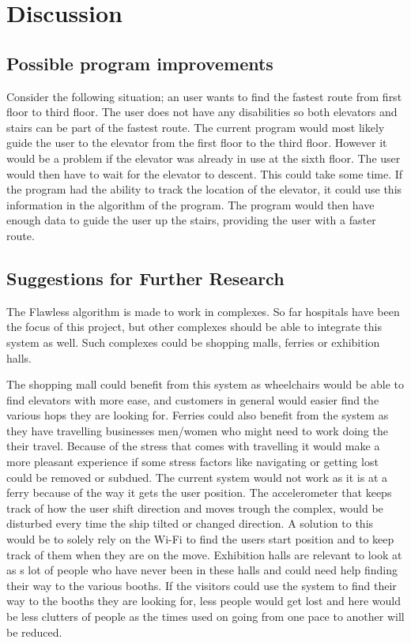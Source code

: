 \chapter{Discussion}

\section{Possible program improvements}

Consider the following situation; an user wants to find the fastest route from first floor to third floor. The user does not have any disabilities so both elevators and stairs can be part of the fastest route. The current program would most likely guide the user to the elevator from the first floor to the third floor. However it would be a problem if the elevator was already in use at the sixth floor. The user would then have to wait for the elevator to descent. This could take some time. If the program had the ability to track the location of the elevator, it could use this information in the algorithm of the program. The program would then have enough data to guide the user up the stairs, providing the user with a faster route.

\section{Suggestions for Further Research}

The Flawless algorithm is made to work in complexes. So far hospitals have been the focus of this project, but other complexes should be able to integrate this system as well. Such complexes could be shopping malls, ferries or exhibition halls. 

The shopping mall could benefit from this system as wheelchairs would be able to find elevators with more ease, and customers in general would easier find the various hops they are looking for. Ferries could also benefit from the system as they have travelling businesses men/women who might need to work doing the their travel. Because of the stress that comes with travelling\cite{future_stress} it would make a more pleasant experience if some stress factors like navigating or getting lost could be removed or subdued. The current system would not work as it is at a ferry because of the way it gets the user position. The accelerometer that keeps track of how the user shift direction and moves trough the complex, would be disturbed every time the ship tilted or changed direction. A solution to this would be to solely rely on the Wi-Fi to find the users start position and to keep track of them when they are on the move. Exhibition halls are relevant to look at as s lot of people who have never been in these halls and could need help finding their way to the various booths. If the visitors could use the system to find their way to the booths they are looking for, less people would get lost and here would be less clutters of people as the times used on going from one pace to another will be reduced.

